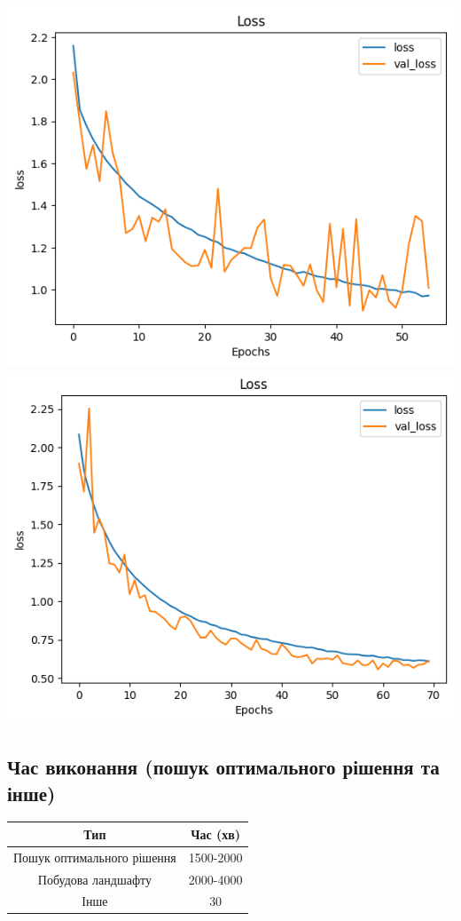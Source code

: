 \documentclass{article}
\begin{document}
    \newline
            \includegraphics[scale=0.5]{before_loss.png}
            \includegraphics[scale=0.5]{after_loss.png}
    \newpage

        \subsection{Час виконання (пошук оптимального рішення та інше)}
            \begin{tabular}{ |c|c| }
                \hline
                Тип & Час (хв)\\ 
                \hline
                Пошук оптимального рішення & 1500-2000\\
                \hline
                Побудова ландшафту & 2000-4000\\
                \hline
                Інше & 30\\
                \hline
            \end{tabular}
\end{document}
